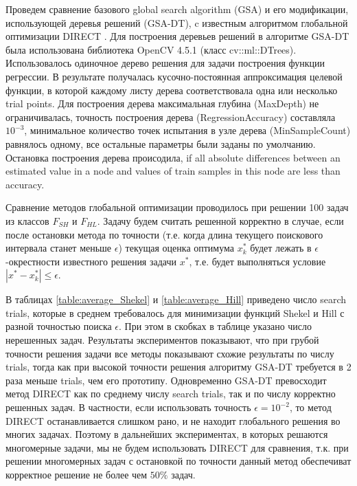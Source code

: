 \documentclass[entropy,article,submit,moreauthors,pdftex]{Definitions/mdpi}
\begin{document}
Проведем сравнение базового global search algorithm (GSA) и его модификации, использующей деревья решений (GSA-DT), c известным алгоритмом глобальной оптимизации DIRECT \cite{Jones2009}.  
Для построения деревьев решений в алгоритме GSA-DT была использована библиотека OpenCV 4.5.1 (класс cv::ml::DTrees). Использовалось одиночное дерево решения для задачи построения функции регрессии. В результате получалась кусочно-постоянная аппроксимация целевой функции, в которой каждому листу дерева соответствовала одна или несколько trial points. 
Для построения дерева максимальная глубина (MaxDepth) не ограничивалась, точность построения дерева (RegressionAccuracy) составляла $10^{-3}$, минимальное количество точек испытания в узле дерева (MinSampleCount) равнялось одному, все остальные параметры были заданы по умолчанию. Остановка построения дерева происодила, if all absolute differences between an estimated value in a node and values of train samples in this node are less than accuracy.

Сравнение методов глобальной оптимизации проводилось при решении 100 задач из классов $F_{SH}$ и $F_{HL}$. Задачу будем считать решенной корректно в случае, если после остановки метода по точности (т.е. когда длина текущего поискового интервала станет меньше $\epsilon$) текущая оценка оптимума $x_k^*$ будет лежать в $\epsilon$-окрестности известного решения задачи $x^*$, т.е. будет выполняться условие $|x^*-x_k^*| \leq \epsilon$.

В таблицах \ref{table:average_Shekel} и \ref{table:average_Hill} приведено число search trials, которые в среднем требовалось для минимизации функций Shekel и Hill с разной точностью поиска $\epsilon$. При этом в скобках в таблице указано число нерешенных задач. Результаты экспериментов показывают, что при грубой точности решения задачи все методы показывают схожие результаты по числу trials, тогда как при высокой точности решения  алгоритму GSA-DT требуется в 2 раза меньше trials, чем его прототипу. Одновременно GSA-DT превосходит метод DIRECT как по среднему числу search trials, так и по числу корректно решенных задач. В частности, если использовать точность $\epsilon = 10^{-2}$, то метод DIRECT останавливается слишком рано, и не находит глобального решения во многих задачах. 
Поэтому в дальнейших экспериментах, в которых решаются многомерные задачи, мы не будем использовать DIRECT для сравнения, т.к. при решении многомерных задач с остановкой по точности данный метод обеспечиват корректное решение не более чем $50\%$ задач. 
\end{document}
